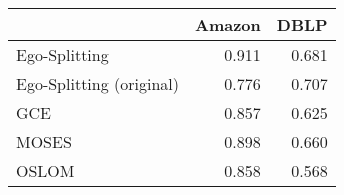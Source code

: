 \begin{tabular}{lrr}
\toprule
{} & Amazon &  DBLP \\
\midrule
Ego-Splitting            &  0.911 & 0.681 \\
Ego-Splitting (original) &  0.776 & 0.707 \\
GCE                      &  0.857 & 0.625 \\
MOSES                    &  0.898 & 0.660 \\
OSLOM                    &  0.858 & 0.568 \\
\bottomrule
\end{tabular}
